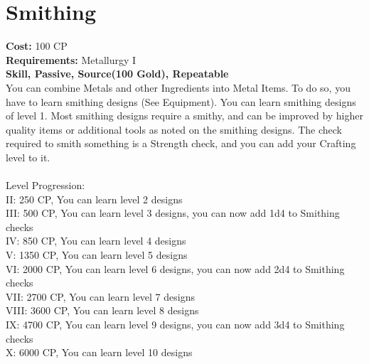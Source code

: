 \section{Smithing}\label{perk:smithing}
\textbf{Cost:} 100 CP\\
\textbf{Requirements:} Metallurgy I\\
\textbf{Skill, Passive, Source(100 Gold), Repeatable}\\
You can combine Metals and other Ingredients into Metal Items.
To do so, you have to learn smithing designs (See Equipment).
You can learn smithing designs of level 1.
Most smithing designs require a smithy, and can be improved by higher quality items or additional tools as noted on the smithing designs.
The check required to smith something is a Strength check, and you can add your Crafting level to it.\\
\\
Level Progression:\\
II: 250 CP, You can learn level 2 designs\\
III: 500 CP, You can learn level 3 designs, you can now add 1d4 to Smithing checks\\
IV: 850 CP, You can learn level 4 designs\\
V: 1350 CP, You can learn level 5 designs\\
VI: 2000 CP, You can learn level 6 designs, you can now add 2d4 to Smithing checks\\
VII: 2700 CP, You can learn level 7 designs\\
VIII: 3600 CP, You can learn level 8 designs\\
IX: 4700 CP, You can learn level 9 designs, you can now add 3d4 to Smithing checks\\
X: 6000 CP, You can learn level 10 designs\\